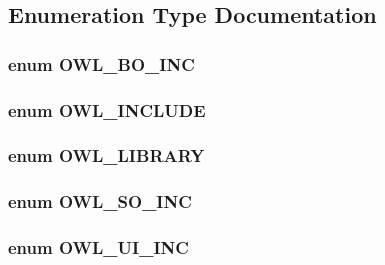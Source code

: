 \subsection{Enumeration Type Documentation}
\hypertarget{OWLloader_8php_ca50646bc73c3addf0e0f25081eae0ae}{
\subsubsection{\setlength{\rightskip}{0pt plus 5cm}enum {\bf OWL\_\-BO\_\-INC}}}
\label{OWLloader_8php_ca50646bc73c3addf0e0f25081eae0ae}


\hypertarget{OWLloader_8php_4d33a8f2fcc9c83cbeea921c4cb23a7f}{
\subsubsection{\setlength{\rightskip}{0pt plus 5cm}enum {\bf OWL\_\-INCLUDE}}}
\label{OWLloader_8php_4d33a8f2fcc9c83cbeea921c4cb23a7f}


\hypertarget{OWLloader_8php_74eed08508c8b70677c4167acf49e427}{
\subsubsection{\setlength{\rightskip}{0pt plus 5cm}enum {\bf OWL\_\-LIBRARY}}}
\label{OWLloader_8php_74eed08508c8b70677c4167acf49e427}


\hypertarget{OWLloader_8php_75dffdef5ba58a0ba5f21ed40627897f}{
\subsubsection{\setlength{\rightskip}{0pt plus 5cm}enum {\bf OWL\_\-SO\_\-INC}}}
\label{OWLloader_8php_75dffdef5ba58a0ba5f21ed40627897f}


\hypertarget{OWLloader_8php_2e11101c70f011a91d0d9c7f8e217738}{
\subsubsection{\setlength{\rightskip}{0pt plus 5cm}enum {\bf OWL\_\-UI\_\-INC}}}
\label{OWLloader_8php_2e11101c70f011a91d0d9c7f8e217738}




